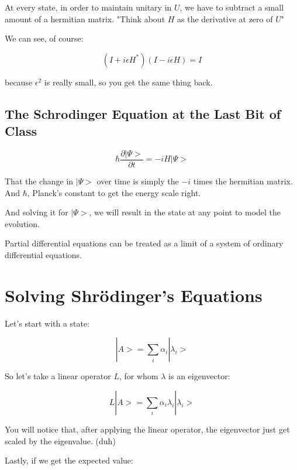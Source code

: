 \documentclass[letterpaper]{article}
\begin{document}
At every state, in order to maintain unitary in \(U\), we have to subtract a small amount of a hermitian matrix. "Think about \(H\) as the derivative at zero of \(U\)"

We can see, of course:

\begin{equation}
   (I+ i \epsilon H^*)(I- i \epsilon H)  = I
\end{equation}

because \(\epsilon^2\) is really small, so you get the same thing back.

\subsection{The Schrodinger Equation at the Last Bit of Class}
\label{sec:org56a2429}
\begin{equation}
   \hbar \frac{\partial | \Psi \big>}{\partial t}  = -i H | \Psi \big>
\end{equation}

That the change in \(|\Psi\big>\) over time is simply the \(-i\) times the hermitian matrix.  And \(\hbar\), Planck's constant to get the energy scale right.

And solving it for \(|\Psi\big>\), we will result in the state at any point to model the evolution.

Partial differential equations can be treated as a limit of a system of ordinary differential equations.

\section{Solving Shrödinger's Equations}
\label{sec:org792093a}
Let's start with a state:

\begin{equation}
    |A \big> = \sum_i \alpha_i | \lambda_i \big>
\end{equation}

So let's take a linear operator \(L\), for whom \(\lambda\) is an eigenvector:

\begin{equation}
   L | A \big> =\sum_i \alpha_i \lambda _i | \lambda _i \big> 
\end{equation}

You will notice that, after applying the linear operator, the eigenvector just get scaled by the eigenvalue. (duh)

Lastly, if we get the expected value:
\end{document}
